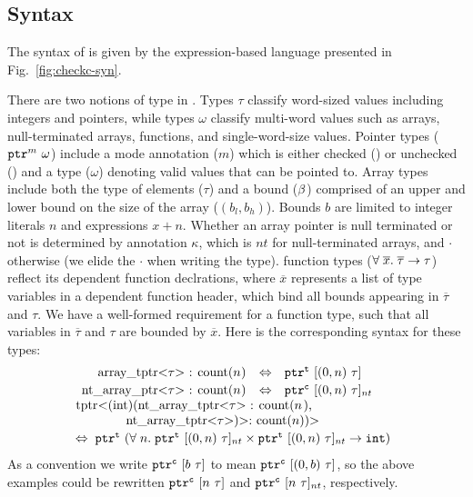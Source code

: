 \subsection{Syntax}\label{sec:syntax}

The syntax of \lang is given by the expression-based
language presented in Fig.~\ref{fig:checkc-syn}.

There are two notions of type in \lang.  Types $\tau$ classify
word-sized values including integers and pointers, while types
$\omega$ classify multi-word values such as arrays, null-terminated
arrays, functions, and single-word-size values.
%
Pointer types ($\mathtt{ptr}^{m}~{\omega}$) include a mode annotation ($m$)
which is either checked (\cmode) or unchecked (\umode) and a type
($\omega$) denoting valid values that can be pointed to. Array types include both the type of
elements ($\tau$) and a bound ($\beta$) comprised of an upper and
lower bound on the size of the array ($(b_l,b_h)$). Bounds $b$ are
limited to integer literals $n$ and expressions $x + n$.
Whether an array pointer is null terminated or not is determined by annotation
$\kappa$, which is $nt$ for null-terminated arrays, and $\cdot$
otherwise (we elide the $\cdot$ when writing the type).
\systemname function types ($\forall \;\overline{x}.\;{\overline{\tau}}\to\tau$)
reflect its dependent function declrations,
where $\overline{x}$ represents
a list of \tint type variables in a dependent function header,
which bind all bounds appearing in $\overline{\tau}$ and $\tau$.
We have a well-formed requirement for a function type,
such that all variables in $\overline{\tau}$ and $\tau$ are bounded by $\overline{x}$.
Here is the
corresponding \checkedc syntax for these types:
\[\hspace*{-0.5em}
\begin{array}{l}
\begin{array}{rcl}
$\code{array_tptr<}$\tau$\code{> : count(}$n$\code{)}$
&\Leftrightarrow& \tarrayptr{0}{n}{\tau}{\tmode}
\\[0.2em]
$\code{nt_array_ptr<}$\tau$\code{> : count(}$n$\code{)}$
&\Leftrightarrow& \tntarrayptr{0}{n}{\tau}{\cmode}
\end{array}
\\[0.2em]
$\code{tptr<(int)(nt_array_tptr<}$\tau$\code{> : count(}$n$\code{),}$\\
\qquad\qquad$\code{nt_array_tptr<}$\tau$\code{>)>: count(}$n$\code{))>}$
\\[0.2em]
\Leftrightarrow\;\; $\tptr{(\tfun{n}{ \tntarrayptr{0}{n}{\tau}{\tmode} \times \tntarrayptr{0}{n}{\tau}{\tmode}}{\tint})}{\tmode}$
\end{array}
\]
As a convention we write $\mathtt{ptr}^{\texttt{c}}~{[{b}~{\tau}]}$ to mean
$\mathtt{ptr}^{\texttt{c}}~{[{({0},{b})}~{\tau}]}$, so the above examples could
be rewritten $\mathtt{ptr}^{\texttt{c}}~{[{n}~{\tau}]}$ and
$\mathtt{ptr}^{\texttt{c}}~{[{n}~{\tau}]_{nt}}$, respectively.

